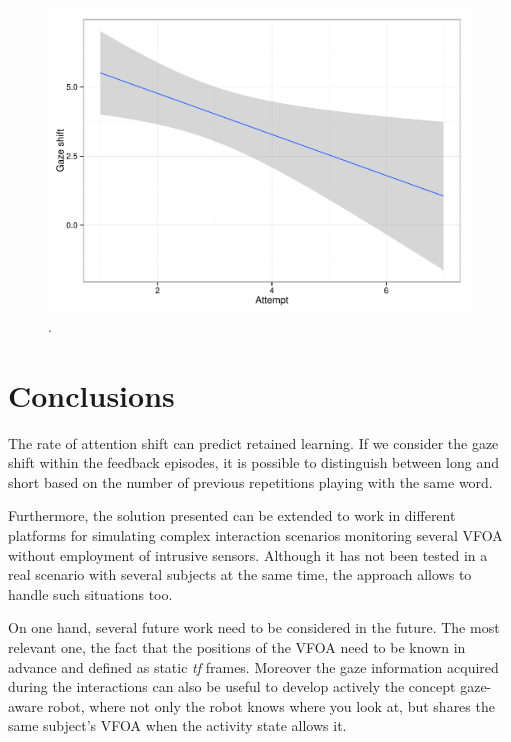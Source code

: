 \documentclass{sig-alternate}
\begin{document}
\begin{figure}[h!]
    \centering
    \includegraphics[width=0.9\columnwidth]{gazeR}
    \caption{\small .}
    \label{gazeR}
\end{figure}
        
        
        
        
\section{Conclusions}
The rate of attention shift can predict retained learning. If we consider the gaze shift within the feedback episodes, it is possible to distinguish between long and short based on the number of previous repetitions playing with the same word.

Furthermore, the solution presented can be extended to work in different platforms for simulating complex interaction scenarios monitoring several VFOA without employment of intrusive sensors. Although it has not been tested in a real scenario with several subjects at the same time, the approach allows to handle such situations too.

On one hand, several future work need to be considered in the future. The most relevant one, the fact that the positions of the VFOA need to be known in advance and defined as static \textit{tf} frames. Moreover the gaze information acquired during the interactions can also be useful to develop actively the concept gaze-aware robot, where not only the robot knows where you look at, but shares the same subject's VFOA when the activity state allows it. 
\end{document}
